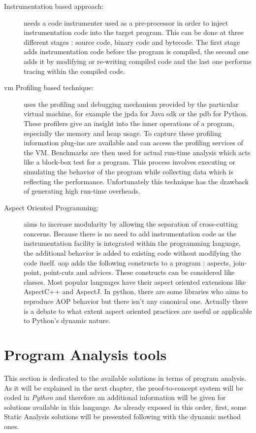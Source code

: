 \begin{description}
  \item[Instrumentation based approach:] needs a code instrumenter used as a pre-processor in order to inject instrumentation code into the target program. This can be done at three different stages : source code, binary code and bytecode. The first stage adds instrumentation code before the program is compiled, the second one adds it by modifying or re-writing compiled code and the last one performs tracing within the compiled code.
  
  \item[\gls{vm} Profiling based technique:] uses the profiling and debugging mechanism provided by the particular virtual machine, for example the \gls{jpda} for Java \gls{sdk} or the \gls{pdb} for Python. These profilers give an insight into the inner operations of a program, especially the memory and heap usage. To capture these profiling information plug-ins are available and can access the profiling services of the VM. Benchmarks are then used for actual run-time analysis which acts like a block-box test for a program. This process involves executing or simulating the behavior of the program while collecting data which is reflecting the performance. Unfortunately this technique has the drawback of generating high run-time overheads. 
  
  \item[Aspect Oriented Programming:] aims to increase modularity by allowing the separation of cross-cutting concerns. Because there is no need to add instrumentation code as the instrumentation facility is integrated within the programming language, the additional behavior is added to existing code without modifying the code itself. \gls{aop} adds the following constructs to a program : aspects, join-point, point-cuts and advices. These constructs can be considered like classes. Most popular languages have their aspect oriented extensions like AspectC++ and AspectJ. In python, there are some libraries who aims to reproduce AOP behavior but there isn't any canonical one. Actually there is a debate to what extent aspect oriented practices are useful or applicable to Python's dynamic nature. %
  
\end{description}


\section{Program Analysis tools}
This section is dedicated to the available solutions in terms of program analysis. As it will be explained in the next chapter, the proof-to-concept system will be coded in \textit{Python} and therefore an additional information will be given for solutions available in this language. As already exposed in this order, first, some Static Analysis solutions will be presented following with the dynamic method ones.

